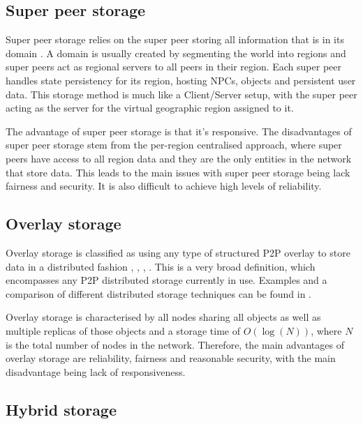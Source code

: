 \documentclass[10pt,a4paper,conference]{IEEEtran}
\begin{document}
\subsection{Super peer storage}

Super peer storage relies on the super peer storing all information that is in its domain \cite{knutsson_p2p_first}. A domain is usually created by
segmenting the world into regions and super peers act as regional servers to all peers in their region. Each super peer handles state persistency for
its region, hosting NPCs, objects and persistent user data. This storage method is much like a Client/Server setup, with the super peer acting as the
server for the virtual geographic region assigned to it.

The advantage of super peer storage is that it's responsive. The disadvantages of super peer storage stem from the per-region centralised approach,
where super peers have access to all region data and they are the only entities in the network that store data. This leads to the main issues with
super peer storage being lack fairness and security. It is also difficult to achieve high levels of reliability.


\subsection{Overlay storage}

Overlay storage is classified as using any type of structured P2P overlay to store data in a distributed fashion \cite{Douglas05enablingmassively},
\cite{using_freenet_storage}, \cite{Fan_phd}, \cite{past_storage_focus}. This is a very broad definition, which encompasses any P2P distributed
storage currently in use. Examples and a comparison of different distributed storage techniques can be found in
\cite{Hasan_distributed_storage_survey}.

Overlay storage is characterised by all nodes sharing all objects as well as multiple replicas of those objects and a storage time of $O(\log(N))$,
where $N$ is the total number of nodes in the network. Therefore, the main advantages of overlay storage are reliability, fairness and reasonable
security, with the main disadvantage being lack of responsiveness.

\subsection{Hybrid storage}
\end{document}
